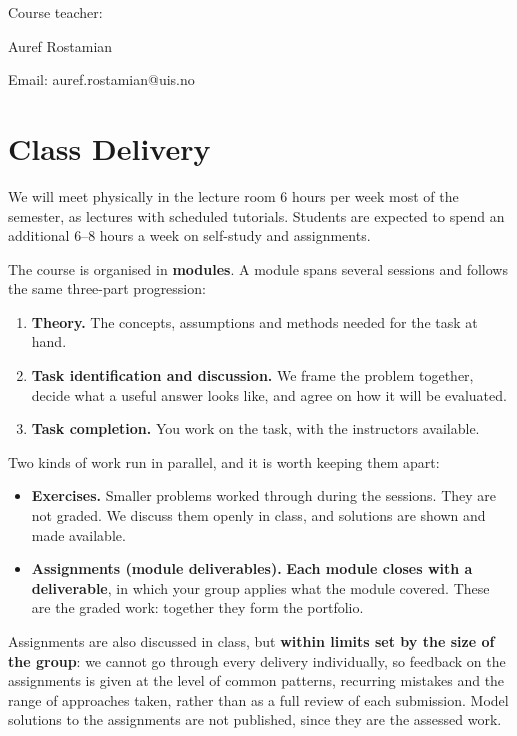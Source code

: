 \documentclass[letterpaper,12pt,oneside]{article}
\begin{document}
Course teacher:

Auref Rostamian

Email: auref.rostamian@uis.no


\section*{Class Delivery}

We will meet physically in the lecture room 6 hours per week most of the semester, as lectures with scheduled tutorials. Students are expected to spend an additional 6--8 hours a week on self-study and assignments.

The course is organised in \textbf{modules}. A module spans several sessions and follows the same three-part progression:

\begin{enumerate}
\item \textbf{Theory.} The concepts, assumptions and methods needed for the task at hand.
\item \textbf{Task identification and discussion.} We frame the problem together, decide what a useful answer looks like, and agree on how it will be evaluated.
\item \textbf{Task completion.} You work on the task, with the instructors available.
\end{enumerate}

Two kinds of work run in parallel, and it is worth keeping them apart:

\begin{itemize}
\item \textbf{Exercises.} Smaller problems worked through during the sessions. They are not graded. We discuss them openly in class, and solutions are shown and made available.
\item \textbf{Assignments (module deliverables).} \textbf{Each module closes with a deliverable}, in which your group applies what the module covered. These are the graded work: together they form the portfolio.
\end{itemize}

Assignments are also discussed in class, but \textbf{within limits set by the size of the group}: we cannot go through every delivery individually, so feedback on the assignments is given at the level of common patterns, recurring mistakes and the range of approaches taken, rather than as a full review of each submission. Model solutions to the assignments are not published, since they are the assessed work.
\end{document}
